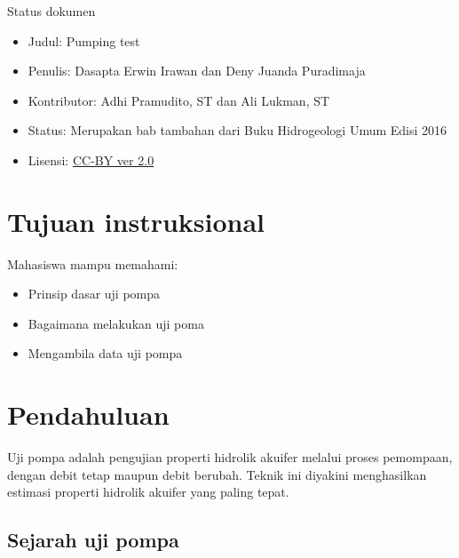 Status dokumen

\begin{itemize}
\item Judul: Pumping test
\end{itemize}
\begin{itemize}
\item Penulis: Dasapta Erwin Irawan dan Deny Juanda Puradimaja
\end{itemize}
\begin{itemize}
\item Kontributor: Adhi Pramudito, ST dan Ali Lukman, ST
\end{itemize}
\begin{itemize}
\item Status: Merupakan bab tambahan dari Buku Hidrogeologi Umum Edisi 2016
\end{itemize}
\begin{itemize}
\item Lisensi: \href{http://creativecommons.org/licenses/by/2.0/}{CC-BY ver 2.0}
\end{itemize}


\section{Tujuan instruksional} 

Mahasiswa mampu memahami:
\begin{itemize}
\item Prinsip dasar uji pompa
\end{itemize}
\begin{itemize}
\item Bagaimana melakukan uji poma
\end{itemize}
\begin{itemize}
\item Mengambila data uji pompa
\end{itemize}


\section{Pendahuluan}

Uji pompa adalah pengujian properti hidrolik akuifer melalui proses pemompaan, dengan debit tetap maupun debit berubah. Teknik ini diyakini menghasilkan estimasi properti hidrolik akuifer yang paling tepat. 

\subsection{Sejarah uji pompa}



